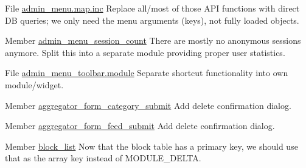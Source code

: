 \label{todo__todo000029}
\hypertarget{todo__todo000029}{}
 
\begin{DoxyDescription}
\item[File \hyperlink{admin__menu_8map_8inc}{admin\_\-menu.map.inc} ]Replace all/most of those API functions with direct DB queries; we only need the menu arguments (keys), not fully loaded objects. 
\end{DoxyDescription}

\label{todo__todo000030}
\hypertarget{todo__todo000030}{}
 
\begin{DoxyDescription}
\item[Member \hyperlink{admin__menu_8module_a6fe5151c8d300535152c76edffcf6f5d}{admin\_\-menu\_\-session\_\-count} ]There are mostly no anonymous sessions anymore. Split this into a separate module providing proper user statistics. 
\end{DoxyDescription}

\label{todo__todo000031}
\hypertarget{todo__todo000031}{}
 
\begin{DoxyDescription}
\item[File \hyperlink{admin__menu__toolbar_8module}{admin\_\-menu\_\-toolbar.module} ]Separate shortcut functionality into own module/widget. 
\end{DoxyDescription}

\label{todo__todo000012}
\hypertarget{todo__todo000012}{}
 
\begin{DoxyDescription}
\item[Member \hyperlink{aggregator_8admin_8inc_a56c1cadf416d17bd8dd8a53cc6ed5aeb}{aggregator\_\-form\_\-category\_\-submit} ]Add delete confirmation dialog. 
\end{DoxyDescription}

\label{todo__todo000011}
\hypertarget{todo__todo000011}{}
 
\begin{DoxyDescription}
\item[Member \hyperlink{aggregator_8admin_8inc_af98f428f07034e19622342875fe30984}{aggregator\_\-form\_\-feed\_\-submit} ]Add delete confirmation dialog. 
\end{DoxyDescription}

\label{todo__todo000013}
\hypertarget{todo__todo000013}{}
 
\begin{DoxyDescription}
\item[Member \hyperlink{block_8module_a38999f916243ed473763738bddea9a6b}{block\_\-list} ]Now that the block table has a primary key, we should use that as the array key instead of MODULE\_\-DELTA. 
\end{DoxyDescription}


